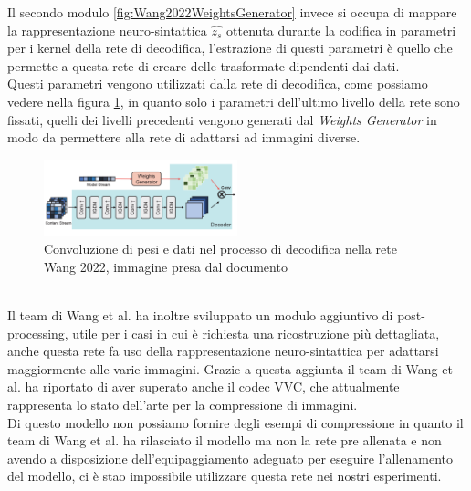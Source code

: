 Il secondo modulo \ref{fig:Wang2022WeightsGenerator} invece si occupa di mappare la rappresentazione neuro-sintattica $\hat{z_{s}}$ ottenuta durante la codifica in parametri per i kernel della rete di decodifica, l’estrazione di questi parametri è quello che permette a questa rete di creare delle trasformate dipendenti dai dati.\\
Questi parametri vengono utilizzati dalla rete di decodifica, come possiamo vedere nella figura \ref{fig:Wang2022Convolution}, in quanto solo i parametri dell’ultimo livello della rete sono fissati, quelli dei livelli precedenti vengono generati dal \textit{Weights Generator} in modo da permettere alla rete di adattarsi ad immagini diverse.\\
\begin{figure}[!h]
    \centering
    \includegraphics[width=0.5\textwidth]{Immagini/Wang2022_Convolution.png}
    \caption{Convoluzione di pesi e dati nel processo di decodifica nella rete Wang 2022, immagine presa dal documento \cite{wang2022neural}}
    \label{fig:Wang2022Convolution}
\end{figure}\\
Il team di Wang et al. ha inoltre sviluppato un modulo aggiuntivo di post-processing, utile per i casi in cui è richiesta una ricostruzione più dettagliata, anche questa rete fa uso della rappresentazione neuro-sintattica per adattarsi maggiormente alle varie immagini. Grazie a questa aggiunta il team di Wang et al. ha riportato di aver superato anche il codec VVC, che attualmente rappresenta lo stato dell’arte per la compressione di immagini.\\
Di questo modello non possiamo fornire degli esempi di compressione in quanto il team di Wang et al. ha rilasciato il modello ma non la rete pre allenata e non avendo a disposizione dell'equipaggiamento adeguato per eseguire l'allenamento del modello, ci è stao impossibile utilizzare questa rete nei nostri esperimenti.\\
\newpage


